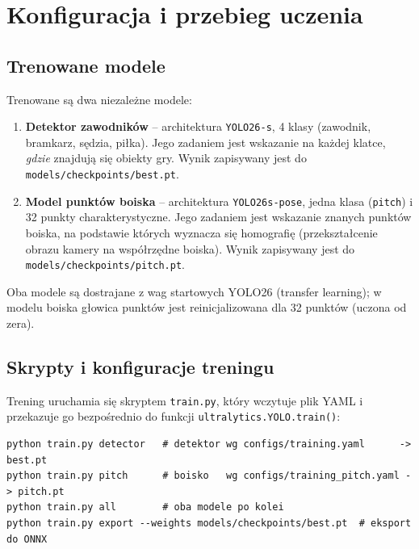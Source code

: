 \documentclass[11pt,a4paper]{article}
\begin{document}
\section{Konfiguracja i przebieg uczenia}

\subsection{Trenowane modele}

Trenowane są dwa niezależne modele:

\begin{enumerate}[nosep]
  \item \textbf{Detektor zawodników} -- architektura \texttt{YOLO26-s}, 4 klasy
        (zawodnik, bramkarz, sędzia, piłka). Jego zadaniem jest wskazanie na
        każdej klatce, \emph{gdzie} znajdują się obiekty gry. Wynik zapisywany
        jest do \texttt{models/checkpoints/best.pt}.
  \item \textbf{Model punktów boiska} -- architektura \texttt{YOLO26s-pose},
        jedna klasa (\texttt{pitch}) i 32 punkty charakterystyczne. Jego
        zadaniem jest wskazanie znanych punktów boiska, na podstawie których
        wyznacza się homografię (przekształcenie obrazu kamery na współrzędne
        boiska). Wynik zapisywany jest do \texttt{models/checkpoints/pitch.pt}.
\end{enumerate}

Oba modele są dostrajane z wag startowych YOLO26 (transfer learning); w modelu
boiska głowica punktów jest reinicjalizowana dla 32 punktów (uczona od zera).

\subsection{Skrypty i konfiguracje treningu}

Trening uruchamia się skryptem \texttt{train.py}, który wczytuje plik YAML i
przekazuje go bezpośrednio do funkcji \texttt{ultralytics.YOLO.train()}:

\begin{lstlisting}[style=sh]
python train.py detector   # detektor wg configs/training.yaml      -> best.pt
python train.py pitch      # boisko   wg configs/training_pitch.yaml -> pitch.pt
python train.py all        # oba modele po kolei
python train.py export --weights models/checkpoints/best.pt  # eksport do ONNX
\end{lstlisting}
\end{document}
